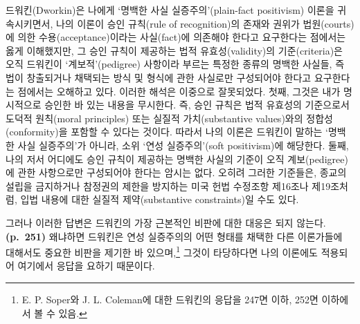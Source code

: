 드워킨(Dworkin)은 나에게 `명백한 사실 실증주의'(plain-fact positivism)
이론을 귀속시키면서, 나의 이론이 승인 규칙(rule of recognition)의 존재와
권위가 법원(courts)에 의한 수용(acceptance)이라는 사실(fact)에 의존해야
한다고 요구한다는 점에서는 옳게 이해했지만, 그 승인 규칙이 제공하는 법적
유효성(validity)의 기준(criteria)은 오직 드워킨이 `계보적'(pedigree)
사항이라 부르는 특정한 종류의 명백한 사실들, 즉 법이 창출되거나 채택되는
방식 및 형식에 관한 사실로만 구성되어야 한다고 요구한다는 점에서는
오해하고 있다. 이러한 해석은 이중으로 잘못되었다. 첫째, 그것은 내가
명시적으로 승인한 바 있는 내용을 무시한다. 즉, 승인 규칙은 법적 유효성의
기준으로서 도덕적 원칙(moral principles) 또는 실질적 가치(substantive
values)와의 정합성(conformity)을 포함할 수 있다는 것이다. 따라서 나의
이론은 드워킨이 말하는 `명백한 사실 실증주의'가 아니라, 소위 `연성
실증주의'(soft positivism)에 해당한다. 둘째, 나의 저서 어디에도 승인
규칙이 제공하는 명백한 사실의 기준이 오직 계보(pedigree)에 관한
사항으로만 구성되어야 한다는 암시는 없다. 오히려 그러한 기준들은, 종교의
설립을 금지하거나 참정권의 제한을 방지하는 미국 헌법 수정조항 제16조나
제19조처럼, 입법 내용에 대한 실질적 제약(substantive constraints)일 수도
있다.

그러나 이러한 답변은 드워킨의 가장 근본적인 비판에 대한 대응은 되지
않는다. \textbf{(p.~251)} 왜냐하면 드워킨은 연성 실증주의의 어떤 형태를
채택한 다른 이론가들에 대해서도 중요한 비판을 제기한 바
있으며,\footnote{E. P. Soper와 J. L. Coleman에 대한 드워킨의 응답을
   247면 이하, 252면 이하에서 볼 수 있음.} 그것이 타당하다면
나의 이론에도 적용되어 여기에서 응답을 요하기 때문이다.

